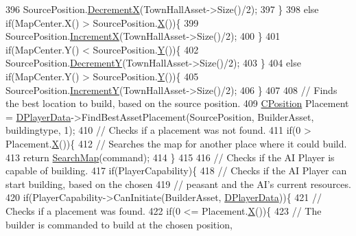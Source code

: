\begin{DoxyCode}
396             SourcePosition.\hyperlink{classCPosition_a64f0d8ef8ca26c8b66b0997b3b132416}{DecrementX}(TownHallAsset->Size()/2);   
397         \}
398         \textcolor{keywordflow}{else} \textcolor{keywordflow}{if}(MapCenter.X() > SourcePosition.\hyperlink{classCPosition_a9a6b94d3b91df1492d166d9964c865fc}{X}())\{
399             SourcePosition.\hyperlink{classCPosition_aa5955d67d5ab7ca74d80cb7303b6eaa9}{IncrementX}(TownHallAsset->Size()/2);
400         \}
401         \textcolor{keywordflow}{if}(MapCenter.Y() < SourcePosition.\hyperlink{classCPosition_a1aa8a30e2f08dda1f797736ba8c13a87}{Y}())\{
402             SourcePosition.\hyperlink{classCPosition_a51ee44d9e0457d6277567fd8a66fdec7}{DecrementY}(TownHallAsset->Size()/2);   
403         \}
404         \textcolor{keywordflow}{else} \textcolor{keywordflow}{if}(MapCenter.Y() > SourcePosition.\hyperlink{classCPosition_a1aa8a30e2f08dda1f797736ba8c13a87}{Y}())\{
405             SourcePosition.\hyperlink{classCPosition_a3f2a26798bb27b1252ff1be303b3adfc}{IncrementY}(TownHallAsset->Size()/2);
406         \}
407 
408         \textcolor{comment}{// Finds the best location to build, based on the source position.}
409         \hyperlink{classCPosition}{CPosition} Placement = \hyperlink{classCAIPlayer_a83b5113c8f7e80df54940b647c5ee2e6}{DPlayerData}->FindBestAssetPlacement(SourcePosition, 
      BuilderAsset, buildingtype, 1);
410         \textcolor{comment}{// Checks if a placement was not found.}
411         \textcolor{keywordflow}{if}(0 > Placement.\hyperlink{classCPosition_a9a6b94d3b91df1492d166d9964c865fc}{X}())\{
412             \textcolor{comment}{// Searches the map for another place where it could build.}
413             \textcolor{keywordflow}{return} \hyperlink{classCAIPlayer_afafbe8fc589e09a16ae1f02f2794d7b0}{SearchMap}(command);
414         \}
415 
416         \textcolor{comment}{// Checks if the AI Player is capable of building.}
417         \textcolor{keywordflow}{if}(PlayerCapability)\{
418             \textcolor{comment}{// Checks if the AI Player can start building, based on the chosen}
419             \textcolor{comment}{// peasant and the AI's current resources.}
420             \textcolor{keywordflow}{if}(PlayerCapability->CanInitiate(BuilderAsset, \hyperlink{classCAIPlayer_a83b5113c8f7e80df54940b647c5ee2e6}{DPlayerData}))\{
421                 \textcolor{comment}{// Checks if a placement was found. }
422                 \textcolor{keywordflow}{if}(0 <= Placement.\hyperlink{classCPosition_a9a6b94d3b91df1492d166d9964c865fc}{X}())\{
423                     \textcolor{comment}{// The builder is commanded to build at the chosen position,}

\end{DoxyCode}
